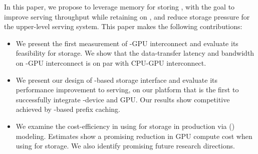 In this paper, we propose to leverage \cxl memory for storing \kvcache, with the goal to improve serving throughput while retaining \slo on \ttft, and reduce \kvcache storage pressure for the upper-level \llm serving system. This paper makes the following contributions:
\begin{itemize} 
\item{} We present the first measurement of \cxl-GPU interconnect and evaluate its feasibility for \kvcache storage. We show that the data-transfer latency and bandwidth on \cxl-GPU interconnect is on par with CPU-GPU interconnect. 
\item{} We present our design of \cxl-based \kvcache storage interface and evaluate its performance improvement to \llm serving, on our platform that is the first to successfully integrate \asic-\cxl device and GPU. Our results show competitive \ttft achieved by \cxl-based prefix caching.
\item{} We examine the cost-efficiency in using \cxl for \kvcache storage in production via \roifull (\roi) modeling. Estimates show a promising reduction in GPU compute cost when using \cxl for \kvcache storage. We also identify promising future research directions.
\end{itemize}





